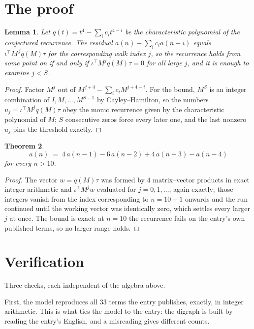 \documentclass[11pt,a4paper]{article}
\theoremstyle{plain}
\newtheorem{theorem}{Theorem}
\newtheorem{lemma}[theorem]{Lemma}
\theoremstyle{definition}
\begin{document}
\section{The proof}

\begin{lemma}\label{lem:crit}
Let $q(t)=t^{4}-\sum_i c_it^{4-i}$ be the characteristic polynomial of the
conjectured recurrence. The residual $a(n)-\sum_ic_ia(n-i)$ equals
$\iota^{\!\top}M^{\,j}q(M)\tau$ for the corresponding walk index $j$, so the recurrence
holds from some point on if and only if $\iota^{\!\top}M^{j}q(M)\tau=0$ for all large $j$,
and it is enough to examine $j<S$.
\end{lemma}

\begin{proof}
Factor $M^{j}$ out of $M^{j+4}-\sum_ic_iM^{j+4-i}$. For the bound, $M^{S}$
is an integer combination of $I,M,\dots,M^{S-1}$ by Cayley--Hamilton, so the numbers
$u_j=\iota^{\!\top}M^{j}q(M)\tau$ obey the monic recurrence given by the characteristic
polynomial of $M$; $S$ consecutive zeros force every later one, and the last nonzero $u_j$
pins the threshold exactly.
\end{proof}

\begin{theorem}
\[
a(n)\;=\;4\,a(n-1) - 6\,a(n-2) + 4\,a(n-3) - a(n-4)
\]
for every $n>10$.
\end{theorem}

\begin{proof}
The vector $w=q(M)\tau$ was formed by $4$ matrix--vector products in exact integer
arithmetic and $\iota^{\!\top}M^{j}w$ evaluated for $j=0,1,\dots$, again exactly; those
integers vanish from the index corresponding to $n=10+1$ onwards and the run continued
until the working vector was identically zero, which settles every larger $j$ at once. The bound is exact: at $n=10$ the recurrence fails on the entry's own published terms, so no larger range holds.
\end{proof}

\section{Verification}

Three checks, each independent of the algebra above.

First, the model reproduces all $33$ terms the entry publishes, exactly, in integer
arithmetic. This is what ties the model to the entry: the digraph is built by reading the
entry's English, and a misreading gives different counts.
\end{document}
